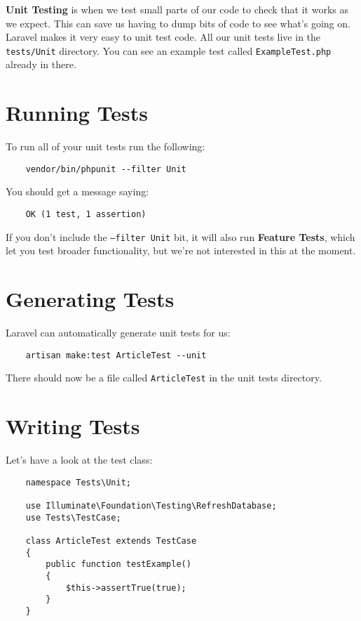 \textbf{Unit Testing} is when we test small parts of our code to check that it works as we expect. This can save us having to dump bits of code to see what's going on.
\\

Laravel makes it very easy to unit test code. All our unit tests live in the \texttt{tests/Unit} directory. You can see an example test called \texttt{ExampleTest.php} already in there.

\section{Running Tests}

To run all of your unit tests run the following:

\begin{verbatim}
    vendor/bin/phpunit --filter Unit
\end{verbatim}

You should get a message saying:

\begin{verbatim}
    OK (1 test, 1 assertion)
\end{verbatim}

If you don't include the \texttt{--filter Unit} bit, it will also run \textbf{Feature Tests}, which let you test broader functionality, but we're not interested in this at the moment.

\section{Generating Tests}

Laravel can automatically generate unit tests for us:

\begin{verbatim}
    artisan make:test ArticleTest --unit
\end{verbatim}

There should now be a file called \texttt{ArticleTest} in the unit tests directory.


\section{Writing Tests}

Let's have a look at the test class:

\begin{verbatim}
    namespace Tests\Unit;

    use Illuminate\Foundation\Testing\RefreshDatabase;
    use Tests\TestCase;

    class ArticleTest extends TestCase
    {
        public function testExample()
        {
            $this->assertTrue(true);
        }
    }
\end{verbatim}

